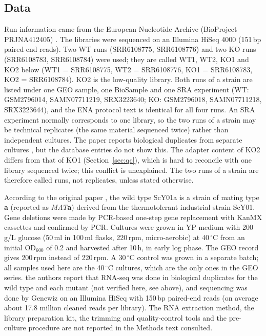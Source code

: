 \documentclass[11pt, a4paper]{article}
\newcommand{\degC}{\,$^\circ$C}
\begin{document}
\subsection{Data}\label{sec:data}
Run information came from the European Nucleotide Archive (BioProject PRJNA412405) \cite{leinonen2011}. The libraries were sequenced on an Illumina HiSeq 4000 (151\,bp paired-end reads). Two WT runs (SRR6108775, SRR6108776) and two KO runs (SRR6108783, SRR6108784) were used; they are called WT1, WT2, KO1 and KO2 below (WT1 = SRR6108775, WT2 = SRR6108776, KO1 = SRR6108783, KO2 = SRR6108784). KO2 is the low-quality library. Both runs of a strain are listed under one GEO sample, one BioSample and one SRA experiment (WT: GSM2796014, SAMN07711219, SRX3223640; KO: GSM2796018, SAMN07711218, SRX3223644), and the ENA protocol text is identical for all four runs. An SRA experiment normally corresponds to one library, so the two runs of a strain may be technical replicates (the same material sequenced twice) rather than independent cultures. The paper reports biological duplicates from separate cultures \cite{gan2021}, but the database entries do not show this. The adapter content of KO2 differs from that of KO1 (Section~\ref{sec:qc}), which is hard to reconcile with one library sequenced twice; this conflict is unexplained. The two runs of a strain are therefore called runs, not replicates, unless stated otherwise.

According to the original paper \cite{gan2021}, the wild type ScY01a is a strain of mating type \textbf{a} (reported as \textit{MAT}\textbf{a}) derived from the thermotolerant industrial strain ScY01. Gene deletions were made by PCR-based one-step gene replacement with KanMX cassettes and confirmed by PCR. Cultures were grown in YP medium with 200\,g/L glucose (50\,ml in 100\,ml flasks, 220\,rpm, micro-aerobic) at 40\degC{} from an initial OD$_{600}$ of 0.2 and harvested after 10\,h, in early log phase. The GEO record gives 200\,rpm instead of 220\,rpm. A 30\degC{} control was grown in a separate batch; all samples used here are the 40\degC{} cultures, which are the only ones in the GEO series. the authors report that RNA-seq was done in biological duplicates for the wild type and each mutant (not verified here, see above), and sequencing was done by Genewiz on an Illumina HiSeq with 150\,bp paired-end reads (on average about 17.8 million cleaned reads per library). The RNA extraction method, the library preparation kit, the trimming and quality-control tools and the pre-culture procedure are not reported in the Methods text consulted.
\end{document}
